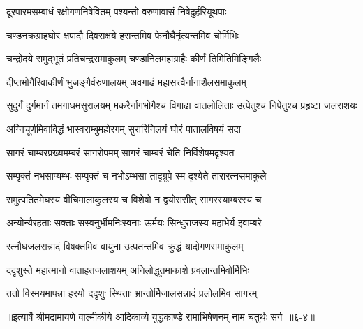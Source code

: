 \twolineshloka
{दूरपारमसम्बाधं रक्षोगणनिषेवितम्}
{पश्यन्तो वरुणावासं निषेदुर्हरियूथपाः} %

\twolineshloka
{चण्डनक्रग्राहघोरं क्षपादौ दिवसक्षये}
{हसन्तमिव फेनौघैर्नृत्यन्तमिव चोर्मिभिः} %

\twolineshloka
{चन्द्रोदये समुद्भूतं प्रतिचन्द्रसमाकुलम्}
{चण्डानिलमहाग्राहैः कीर्णं तिमितिमिङ्गिलैः} %

\twolineshloka
{दीप्तभोगैरिवाकीर्णं भुजङ्गैर्वरुणालयम्}
{अवगाढं महासत्त्वैर्नानाशैलसमाकुलम्} %

\threelineshloka
{सुदुर्गं दुर्गमार्गं तमगाधमसुरालयम्}
{मकरैर्नागभोगैश्च विगाढा वातलोलिताः}
{उत्पेतुश्च निपेतुश्च प्रहृष्टा जलराशयः} %

\twolineshloka
{अग्निचूर्णमिवाविद्धं भास्वराम्बुमहोरगम्}
{सुरारिनिलयं घोरं पातालविषयं सदा} %

\twolineshloka
{सागरं चाम्बरप्रख्यमम्बरं सागरोपमम्}
{सागरं चाम्बरं चेति निर्विशेषमदृश्यत} %

\twolineshloka
{सम्पृक्तं नभसाप्यम्भः सम्पृक्तं च नभोऽम्भसा}
{तादृग्रूपे स्म दृश्येते तारारत्नसमाकुले} %

\twolineshloka
{समुत्पतितमेघस्य वीचिमालाकुलस्य च}
{विशेषो न द्वयोरासीत् सागरस्याम्बरस्य च} %

\twolineshloka
{अन्योन्यैरहताः सक्ताः सस्वनुर्भीमनिःस्वनाः}
{ऊर्मयः सिन्धुराजस्य महाभेर्य इवाम्बरे} %

\twolineshloka
{रत्नौघजलसन्नादं विषक्तमिव वायुना}
{उत्पतन्तमिव क्रुद्धं यादोगणसमाकुलम्} %

\twolineshloka
{ददृशुस्ते महात्मानो वाताहतजलाशयम्}
{अनिलोद्धूतमाकाशे प्रवलान्तमिवोर्मिभिः} %

\twolineshloka
{ततो विस्मयमापन्ना हरयो ददृशुः स्थिताः}
{भ्रान्तोर्मिजालसन्नादं प्रलोलमिव सागरम्} %


॥इत्यार्षे श्रीमद्रामायणे वाल्मीकीये आदिकाव्ये युद्धकाण्डे रामाभिषेणनम् नाम चतुर्थः सर्गः ॥६-४॥
